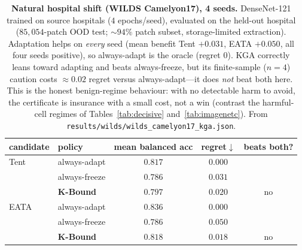 \documentclass[conference]{IEEEtran}
\theoremstyle{plain}
\theoremstyle{definition}
\begin{document}
\begin{table}[t]\centering\small
\begin{tabular}{llccc}
\toprule
candidate & policy & mean balanced acc & regret$\downarrow$ & beats both? \\
\midrule
Tent & always-adapt    & $0.817$ & $\mathbf{0.000}$ & \\
     & always-freeze   & $0.786$ & $0.031$ & \\
     & \textbf{K-Bound} & $0.797$ & $0.020$ & no \\
\midrule
EATA & always-adapt    & $0.836$ & $\mathbf{0.000}$ & \\
     & always-freeze   & $0.786$ & $0.050$ & \\
     & \textbf{K-Bound} & $0.818$ & $0.018$ & no \\
\bottomrule
\end{tabular}
\caption{\textbf{Natural hospital shift (WILDS Camelyon17), 4 seeds.} DenseNet-121 trained on
source hospitals ($4$ epochs/seed), evaluated on the held-out hospital ($85{,}054$-patch OOD
test; $\sim\!94\%$ patch subset, storage-limited extraction). Adaptation helps on \emph{every}
seed (mean benefit Tent $+0.031$, EATA $+0.050$, all four seeds positive), so always-adapt is
the oracle (regret $0$). \textsc{KGA} correctly leans toward adapting and beats always-freeze,
but its finite-sample ($n{=}4$) caution costs $\approx\!0.02$ regret versus always-adapt---it
does \emph{not} beat both here. This is the honest benign-regime behaviour: with no detectable
harm to avoid, the certificate is insurance with a small cost, not a win (contrast the
harmful-cell regimes of Tables~\ref{tab:decisive} and~\ref{tab:imagenetc}). From
\texttt{results/wilds/wilds\_camelyon17\_kga.json}.}
\label{tab:camelyon}
\end{table}
\end{document}
